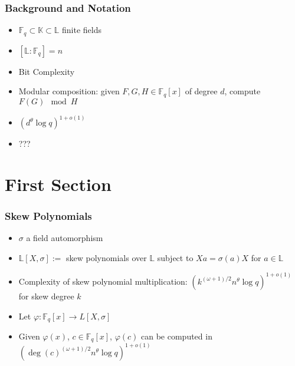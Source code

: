 \documentclass{beamer}
\newcommand{\L}{\mathbb{L}}
\newcommand{\F}{\mathbb{F}}
\begin{document}
\begin{frame}
\frametitle{Background and Notation}

\begin{itemize}

\item $\mathbb{F}_q \subset \mathbb{K} \subset \mathbb{L}$ finite fields
\item $[\mathbb{L} : \F_q] = n$
\item Bit Complexity
\item Modular composition: given $F,G,H \in \F_q[x]$ of degree $d$, compute $F(G) \mod H$

\item $(d^{\theta} \log q)^{1 + o(1)}$
\item ???

  
  
  
  
\end{itemize}

\end{frame}


\section{First Section} %



\begin{frame}
\frametitle{Skew Polynomials}
\begin{itemize}
\item $\sigma$ a field automorphism
\item $\L[X,\sigma] := $ skew polynomials over $\L$ subject to $Xa = \sigma(a)X$ for $a \in \mathbb{L}$ 

\item Complexity of skew polynomial multiplication: $(k^{(\omega +1)/2}n^{\theta} \log q)^{1 + o(1)}$ for skew degree $k$

\item Let $\varphi: \F_q[x] \to L[X,\sigma]$
\item Given $\varphi(x)$, $c \in \F_q[x]$, $\varphi(c)$ can be computed in $(\deg(c)^{(\omega + 1)/2}n^{\theta} \log q)^{1 + o(1)} $


\end{itemize}


\end{frame}
\end{document}
